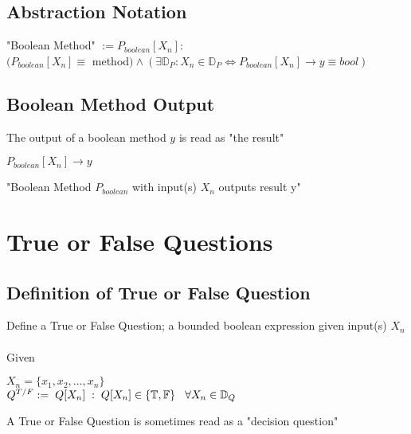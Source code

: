 \documentclass[11pt]{article}
\begin{document}
\subsection{Abstraction Notation}
\begin{center}
"Boolean Method" $:= P_{boolean}[X_n]:
$
\\ \vspace{2mm}
$
(P_{boolean}[X_n] \equiv $ method$) \land (\exists \mathbb{D}_P : X_n \in \mathbb{D}_P \Leftrightarrow P_{boolean}[X_n] \rightarrow y \equiv bool) 
$
\end{center}


\subsection{Boolean Method Output}
The output of a boolean method $y$ is read as "the result"
\vspace{1mm}
\begin{center}
$
P_{boolean}[X_n] \rightarrow y
$
\end{center}
\vspace{1mm}
"Boolean Method $P_{boolean}$ with input(s) $X_n$ outputs result y"







\newpage

\section{True or False Questions}

\subsection{Definition of True or False Question}
Define a True or False Question; a bounded boolean expression given input(s) $X_n$\\
\\
Given
\begin{center}
$
X_n = \{x_1,x_2,...,x_n\}
$
\\ \vspace{4mm}
$
Q^{T/F} := \hspace{1mm}Q[X_n]\hspace{1mm}:\hspace{1mm} Q[X_n] \in \{\mathbb{T},\mathbb{F}\} \hspace{3mm} \forall X_n \in \mathbb{D}_Q
$
\vspace{1mm}
\end{center}
A True or False Question is sometimes read as a "decision question"
\end{document}

